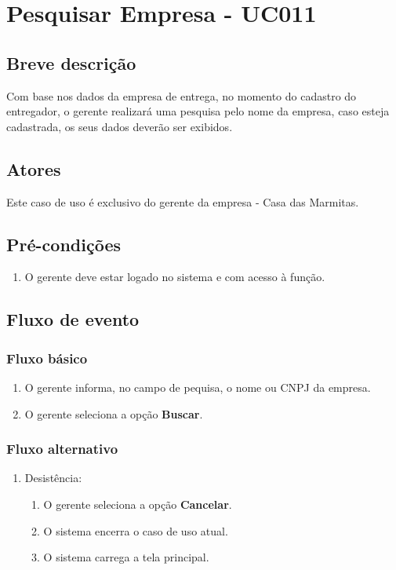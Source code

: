\chapter{Pesquisar Empresa - UC011} \label{uc011}

\section{Breve descrição}

Com base nos dados da empresa de entrega, no momento do cadastro do entregador, o gerente realizará uma pesquisa pelo nome da empresa, caso esteja cadastrada, os seus dados deverão ser exibidos.

\section{Atores}

Este caso de uso é exclusivo do gerente da empresa - Casa das Marmitas.

\section{Pré-condições}

\begin{enumerate}
	\item O gerente deve estar logado no sistema e com acesso à função.
\end{enumerate}

\section{Fluxo de evento}

\subsection{Fluxo básico}

\begin{enumerate}
	\item O gerente informa, no campo de pequisa, o nome ou CNPJ da empresa.
	\item O gerente seleciona a opção \textbf{Buscar}.
\end{enumerate}

\subsection{Fluxo alternativo}

\begin{enumerate}
	\item Desistência:
	\begin{enumerate}
		\item O gerente seleciona a opção \textbf{Cancelar}.
		\item O sistema encerra o caso de uso atual.
		\item O sistema carrega a tela principal.
	\end{enumerate}
\end{enumerate}


